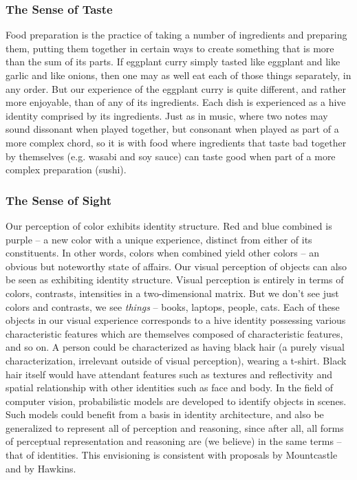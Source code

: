 \documentclass[pra,twocolumn,groupedaddress,10pt]{revtex4}
\theoremstyle{definition}
\begin{document}
\subsubsection{The Sense of Taste} \label{sec:sentas}

Food preparation is the practice of taking a number of ingredients and preparing them, putting them together in certain ways to create something that is more than the sum of its parts. If eggplant curry simply tasted like eggplant and like garlic and like onions, then one may as well eat each of those things separately, in any order. But our experience of the eggplant curry is quite different, and rather more enjoyable, than of any of its ingredients. Each dish is experienced as a hive identity comprised by its ingredients. Just as in music, where two notes may sound dissonant when played together, but consonant when played as part of a more complex chord, so it is with food where ingredients that taste bad together by themselves (e.g. wasabi and soy sauce) can taste good when part of a more complex preparation (sushi).

\subsubsection{The Sense of Sight} \label{sec:sensig}

Our perception of color exhibits identity structure. Red and blue combined is purple -- a new color with a unique experience, distinct from either of its constituents. In other words, colors when combined yield other colors -- an obvious but noteworthy state of affairs. Our visual perception of objects can also be seen as exhibiting identity structure. Visual perception is entirely in terms of colors, contrasts, intensities in a two-dimensional matrix. But we don't see just colors and contrasts, we see \textit{things} -- books, laptops, people, cats. Each of these objects in our visual experience corresponds to a hive identity possessing various characteristic features which are themselves composed of characteristic features, and so on. A person could be characterized as having black hair (a purely visual characterization, irrelevant outside of visual perception), wearing a t-shirt. Black hair itself would have attendant features such as textures and reflectivity and spatial relationship with other identities such as face and body. In the field of computer vision, probabilistic models are developed to identify objects in scenes. Such models could benefit from a basis in identity architecture, and also be generalized to represent all of perception and reasoning, since after all, all forms of perceptual representation and reasoning are (we believe) in the same terms -- that of identities. This envisioning is consistent with proposals by Mountcastle\cite{mountcastle} and by Hawkins\cite{hawkins}.
\end{document}
